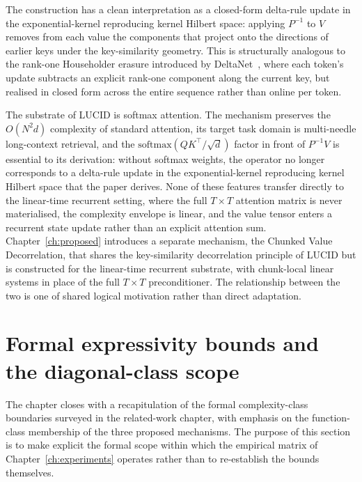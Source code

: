 The construction has a clean interpretation as a closed-form
delta-rule update in the exponential-kernel reproducing kernel
Hilbert space: applying $P^{-1}$ to $V$ removes from each value the
components that project onto the directions of earlier keys under the
key-similarity geometry. This is structurally analogous to the
rank-one Householder erasure introduced by
DeltaNet~\cite{schlag2021deltanet,yang2024deltanet}, where each
token's update subtracts an explicit rank-one component along the
current key, but realised in closed form across the entire sequence
rather than online per token.

The substrate of LUCID is softmax attention. The mechanism preserves
the $O(N^{2} d)$ complexity of standard attention, its target task
domain is multi-needle long-context retrieval, and the
$\mathrm{softmax}(Q K^{\top} / \sqrt{d})$ factor in front of
$P^{-1} V$ is essential to its derivation: without softmax weights,
the operator no longer corresponds to a delta-rule update in the
exponential-kernel reproducing kernel Hilbert space that the paper
derives. None of these features transfer directly to the linear-time
recurrent setting, where the full $T \times T$ attention matrix is
never materialised, the complexity envelope is linear, and the value
tensor enters a recurrent state update rather than an explicit
attention sum. Chapter~\ref{ch:proposed} introduces a separate
mechanism, the Chunked Value Decorrelation, that shares the
key-similarity decorrelation principle of LUCID but is constructed
for the linear-time recurrent substrate, with chunk-local linear
systems in place of the full $T \times T$ preconditioner. The
relationship between the two is one of shared logical motivation
rather than direct adaptation.

\section{Formal expressivity bounds and the diagonal-class scope}\label{sec:bounds}

The chapter closes with a recapitulation of the formal
complexity-class boundaries surveyed in the related-work chapter,
with emphasis on the function-class membership of the three
proposed mechanisms. The purpose of this section is to make
explicit the formal scope within which the empirical matrix of
Chapter~\ref{ch:experiments} operates rather than to re-establish
the bounds themselves.

